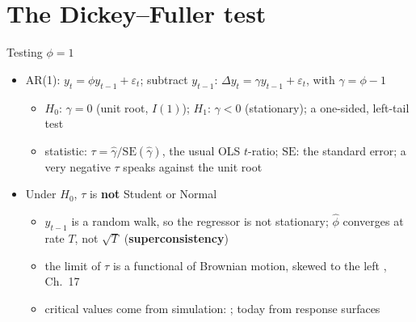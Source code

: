 \section{The Dickey--Fuller test}

\begin{frame}{Testing $\phi = 1$}
\itemsize{\small}
\begin{itemize}
    \item AR(1): $y_t = \phi y_{t-1} + \varepsilon_t$; subtract $y_{t-1}$: $\Delta y_t = \gamma y_{t-1} + \varepsilon_t$, with $\gamma = \phi - 1$
    \begin{itemize}
        \item $H_0$: $\gamma = 0$ (unit root, $I(1)$); $H_1$: $\gamma < 0$ (stationary); a one-sided, left-tail test
        \item statistic: $\tau = \hat\gamma/\mathrm{SE}(\hat\gamma)$, the usual OLS $t$-ratio; $\mathrm{SE}$: the standard error; a very negative $\tau$ speaks against the unit root
    \end{itemize}
    \item Under $H_0$, $\tau$ is \textbf{not} Student or Normal 
    \begin{itemize}
        \item $y_{t-1}$ is a random walk, so the regressor is not stationary; $\hat\phi$ converges at rate $T$, not $\sqrt{T}$ (\textbf{superconsistency})
        \item the limit of $\tau$ is a functional of Brownian motion, skewed to the left , Ch.~17
        \item critical values come from simulation: ; today from response surfaces 
    \end{itemize}
\end{itemize}
\end{frame}

